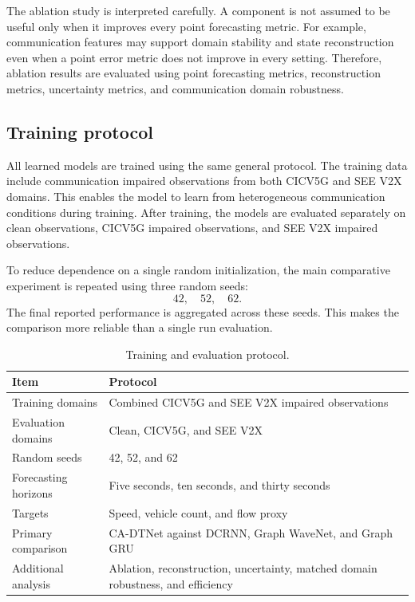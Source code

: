 \documentclass[pdflatex,sn-mathphys-num]{sn-jnl}%
\theoremstyle{thmstyleone}%
\theoremstyle{thmstyletwo}%
\theoremstyle{thmstylethree}%
\begin{document}
The ablation study is interpreted carefully. A component is not assumed to be useful only when it improves every point forecasting metric. For example, communication features may support domain stability and state reconstruction even when a point error metric does not improve in every setting. Therefore, ablation results are evaluated using point forecasting metrics, reconstruction metrics, uncertainty metrics, and communication domain robustness.

\subsection{Training protocol}
\label{subsec:training_protocol}

All learned models are trained using the same general protocol. The training data include communication impaired observations from both CICV5G and SEE V2X domains. This enables the model to learn from heterogeneous communication conditions during training. After training, the models are evaluated separately on clean observations, CICV5G impaired observations, and SEE V2X impaired observations.

To reduce dependence on a single random initialization, the main comparative experiment is repeated using three random seeds:
\begin{equation}
    42,\quad 52,\quad 62.
\end{equation}
The final reported performance is aggregated across these seeds. This makes the comparison more reliable than a single run evaluation.

\begin{table}[htbp]
\centering
\caption{Training and evaluation protocol.}
\label{tab:training_protocol}
\small
\begin{tabular}{p{4.0cm} p{7.0cm}}
\hline
Item & Protocol \\
\hline
Training domains & Combined CICV5G and SEE V2X impaired observations \\
Evaluation domains & Clean, CICV5G, and SEE V2X \\
Random seeds & 42, 52, and 62 \\
Forecasting horizons & Five seconds, ten seconds, and thirty seconds \\
Targets & Speed, vehicle count, and flow proxy \\
Primary comparison & CA-DTNet against DCRNN, Graph WaveNet, and Graph GRU \\
Additional analysis & Ablation, reconstruction, uncertainty, matched domain robustness, and efficiency \\
\hline
\end{tabular}
\end{table}
\end{document}
